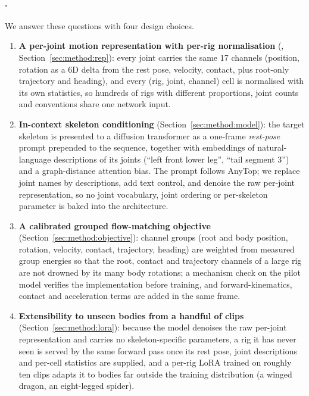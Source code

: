 \paragraph{\method{}.} We answer these questions with four design choices.
\begin{enumerate}[leftmargin=*,itemsep=1pt,topsep=2pt]
\item \textbf{A per-joint motion representation with per-rig normalisation}
  (\rep{}, Section~\ref{sec:method:rep}): every joint carries the same 17
  channels (position, rotation as a 6D delta from the rest pose, velocity,
  contact, plus root-only trajectory and heading), and every (rig, joint,
  channel) cell is normalised with its own statistics, so hundreds of rigs with
  different proportions, joint counts and conventions share one network input.
\item \textbf{In-context skeleton conditioning}
  (Section~\ref{sec:method:model}): the target skeleton is presented to a
  diffusion transformer as a one-frame \emph{rest-pose} prompt prepended to
  the sequence, together with embeddings of natural-language descriptions of
  its joints (``left front lower leg'', ``tail segment 3'') and a
  graph-distance attention bias. The prompt follows AnyTop; we replace joint
  names by descriptions, add text control, and denoise the raw per-joint
  representation, so no joint vocabulary, joint ordering or per-skeleton
  parameter is baked into the architecture.
\item \textbf{A calibrated grouped flow-matching objective}
  (Section~\ref{sec:method:objective}): channel groups (root and body
  position, rotation, velocity, contact, trajectory, heading) are weighted from
  measured group energies so that the root, contact and trajectory channels of
  a large rig are not drowned by its many body rotations; a mechanism check on
  the pilot model verifies the implementation before training, and
  forward-kinematics, contact and acceleration terms are added in the same
  frame.
\item \textbf{Extensibility to unseen bodies from a handful of clips}
  (Section~\ref{sec:method:lora}): because the model denoises the raw
  per-joint representation and carries no skeleton-specific parameters, a rig
  it has never seen is served by the same forward pass once its rest pose,
  joint descriptions and per-cell statistics are supplied, and a per-rig LoRA
  trained on roughly ten clips adapts it to bodies far outside the training
  distribution (a winged dragon, an eight-legged spider).
\end{enumerate}


